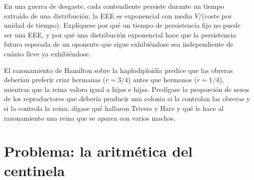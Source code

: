 \begin{exercise}[$\star\star\star$]\label{exo:b3:behavioural-ecology:11}
En una guerra de desgaste, cada contendiente persiste durante un tiempo
extraído de una distribución; la EEE es exponencial con media
$V/$(coste por unidad de tiempo). Explíquese por qué un tiempo de
persistencia fijo no puede ser una EEE, y por qué una distribución
exponencial hace que la persistencia futura esperada de un oponente que
sigue exhibiéndose sea independiente de cuánto lleve ya exhibiéndose.
\end{exercise}

\begin{exercise}[$\star\star\star$]\label{exo:b3:behavioural-ecology:12}
El razonamiento de Hamilton sobre la haplodiploidía predice que las
obreras deberían preferir criar hermanas ($r = 3/4$) antes que hermanos
($r = 1/4$), mientras que la reina valora igual a hijos e hijas.
Predígase la proporción de sexos de los reproductores que debería
producir una colonia si la controlan las obreras y si la controla la
reina; dígase qué hallaron Trivers y Hare y qué le hace al razonamiento
una reina que se aparea con varios machos.
\end{exercise}

\section{Problema: la aritmética del centinela}

